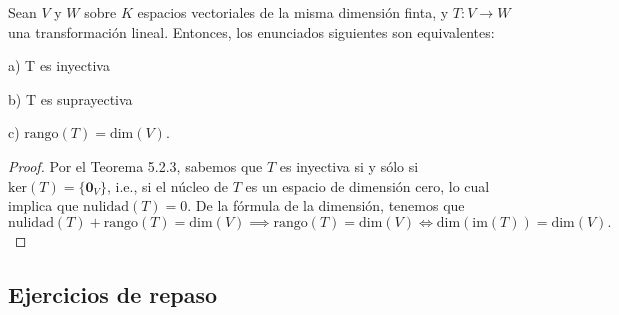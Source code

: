 \documentclass[12pt]{article}
\newenvironment{teorema}[2][Teorema]{\begin{trivlist}
\item[\hskip \labelsep {\bfseries #1}\hskip \labelsep {\bfseries #2.}]}{\end{trivlist}}
\begin{document}
\begin{teorema} {5.3.2}
    Sean $V$ y $W$ sobre $K$ espacios vectoriales de la misma dimensión finta, y $T:V\to W$ una transformación lineal. Entonces, los enunciados siguientes son equivalentes:

    \hspace{3mm} a) T es inyectiva

    \hspace{3mm} b) T es suprayectiva

    \hspace{3mm} c) $\text{rango}(T)=\text{dim}(V).$

\begin{proof}
    Por el Teorema 5.2.3, sabemos que $T$ es inyectiva si y sólo si $\text{ker}(T)=\{\mathbf{0}_V\}$, i.e., si el núcleo de $T$ es un espacio de dimensión cero, lo cual implica que $\text{nulidad}(T)=0.$ De la fórmula de la dimensión, tenemos que $\text{nulidad}(T)+\text{rango}(T)=\text{dim}(V)\implies \text{rango}(T)=\text{dim}(V)\iff \text{dim}(\text{im}(T))=\text{dim}(V).$ 
\end{proof}

\end{teorema}

\subsection{Ejercicios de repaso}
\end{document}
